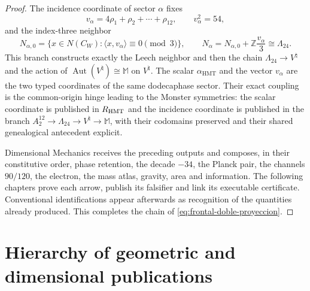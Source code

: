 \begin{proof}
The incidence coordinate of sector \(\alpha\) fixes
\[
v_\alpha=4\rho_1+\rho_2+\cdots+\rho_{12},
\qquad v_\alpha^2=54,
\]
and the index-three neighbor
\[
N_{\alpha,0}
=\{x\in N(C_W):\langle x,v_\alpha\rangle\equiv0\pmod3\},
\qquad
N_\alpha=N_{\alpha,0}+\mathbb Z\frac{v_\alpha}{3}
\cong\Lambda_{24}.
\]
This branch constructs exactly the Leech neighbor and then the chain
\(\Lambda_{24}\to V^\natural\) and the action of
\(\operatorname{Aut}(V^\natural)\cong\mathbb M\) on \(V^\natural\). The
scalar \(\alpha_{\mathrm{HMT}}\) and the vector \(v_\alpha\) are the two
typed coordinates of the same dodecaphase sector. Their exact coupling is
the common-origin hinge leading to the Monster symmetries: the
scalar coordinate is published in \(\mathbb R_{\rm HMT}\) and the incidence
coordinate is published in the branch
\(A_2^{12}\to\Lambda_{24}\to V^\natural\to\mathbb M\), with their codomains
preserved and their shared genealogical antecedent explicit.

Dimensional Mechanics receives the preceding outputs and composes, in their
constitutive order, phase retention, the decade \(-34\), the Planck pair,
the channels \(90/120\), the electron, the mass atlas, gravity, area
and information. The following chapters prove each arrow, publish
its falsifier and link its executable certificate. Conventional
identifications appear afterwards as recognition of the quantities already
produced. This completes the chain of
\eqref{eq:frontal-doble-proyeccion}.
\end{proof}

\section*{Hierarchy of geometric and dimensional publications}

